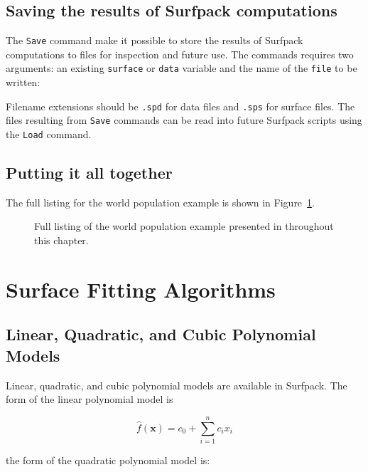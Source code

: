 \documentclass{article}
\begin{document}
\subsection{Saving the results of Surfpack computations}\label{sec:saving}
The \texttt{Save} command make it possible to store the results of Surfpack computations to files for inspection and future use.  The commands requires two arguments: an existing \texttt{surface} or \texttt{data} variable and the name of the \texttt{file} to be written:

Filename extensions should be \texttt{.spd} for data files and \texttt{.sps} for surface files.
The files resulting from \texttt{Save} commands can be read into future Surfpack scripts using the \texttt{Load} command.

\subsection{Putting it all together}
The full listing for the world population example is shown in Figure~\ref{fig:full_listing}.

\begin{figure}[htbp]
  \centering
  \begin{bigbox}
	\begin{small}
 	\end{small}
  \end{bigbox}
  \caption{Full listing of the world population example presented in throughout this chapter.}
   \label{fig:full_listing}
\end{figure}

\section{Surface Fitting Algorithms}
\subsection{Linear, Quadratic, and Cubic Polynomial Models}\label{models:surf:polynomial}

Linear, quadratic, and cubic polynomial models are available in
Surfpack. The form of the linear polynomial model is

\begin{equation}
  \hat{f}(\mathbf{x}) = c_{0}+\sum_{i=1}^{n}c_{i}x_{i}
  \label{models:surf:equation01}
\end{equation}

the form of the quadratic polynomial model is:
\end{document}
